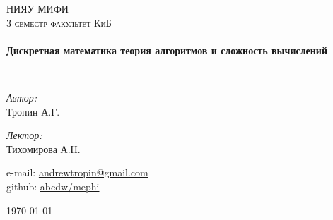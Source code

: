 \begin{titlepage}
  \begin{center}


    \textsc{\LARGE НИЯУ МИФИ}\\[1.5cm]

    \textsc{\Large 3 семестр факультет КиБ}\\[0.5cm]

    \HRule \\[0.4cm]
    {\huge \bfseries Дискретная математика теория алгоритмов 
    и сложность вычислений\\[0.4cm]}

    \HRule \\[1.5cm]

    \begin{minipage}{0.4\textwidth}
      \begin{flushleft} \large
        \emph{Автор:}\\
        Тропин \textsc{А.Г.}
      \end{flushleft}
    \end{minipage}
    \begin{minipage}{0.4\textwidth}
      \begin{flushright} \large
        \emph{Лектор:} \\
        Тихомирова \textsc{А.Н.}
      \end{flushright}
    \end{minipage}

    \vfill
    \begin{flushleft}
      e-mail: \href{mailto:andrewtropin@gmail.com}{andrewtropin@gmail.com} \\
      github: \href{http://github.com/abcdw/mephi}{abcdw/mephi}
    \end{flushleft}
    {\large \today}
  \end{center}
\end{titlepage}
